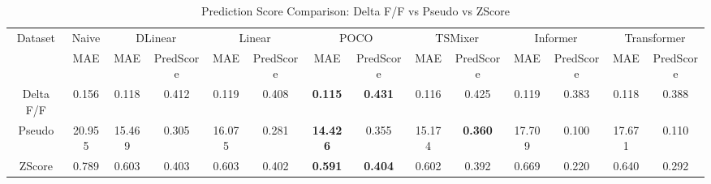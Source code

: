 \begin{table}[h!]
\centering
\caption{Prediction Score Comparison: Delta F/F vs Pseudo vs ZScore}
\label{tab:prediction_score_comparison}
\begin{tabular}{|c|c|c|c|c|c|c|c|c|c|c|c|c|c|}
\hline
\multirow{2}{*}{Dataset} & {Naive} & \multicolumn{2}{c|}{DLinear} & \multicolumn{2}{c|}{Linear} & \multicolumn{2}{c|}{POCO} & \multicolumn{2}{c|}{TSMixer} & \multicolumn{2}{c|}{Informer} & \multicolumn{2}{c|}{Transformer} \\
 & MAE & MAE & PredScore & MAE & PredScore & MAE & PredScore & MAE & PredScore & MAE & PredScore & MAE & PredScore \\
\hline
Delta F/F & 0.156 & 0.118 & 0.412 & 0.119 & 0.408 & \textbf{0.115} & \textbf{0.431} & 0.116 & 0.425 & 0.119 & 0.383 & 0.118 & 0.388 \\
Pseudo & 20.955 & 15.469 & 0.305 & 16.075 & 0.281 & \textbf{14.426} & 0.355 & 15.174 & \textbf{0.360} & 17.709 & 0.100 & 17.671 & 0.110 \\
ZScore & 0.789 & 0.603 & 0.403 & 0.603 & 0.402 & \textbf{0.591} & \textbf{0.404} & 0.602 & 0.392 & 0.669 & 0.220 & 0.640 & 0.292 \\
\hline
\end{tabular}
\end{table}